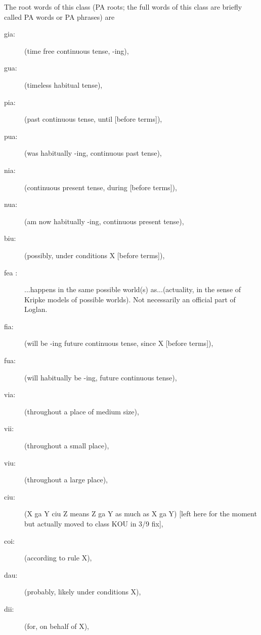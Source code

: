 \documentclass[12pt]{book}
\begin{document}
The root words of this class  (PA roots;  the full words of this class are briefly called PA words or PA phrases) are
\begin{description}

\item[gia:] (time free continuous tense, -ing), 

\item[gua:]  (timeless habitual tense), 

\item[pia:]  (past continuous tense, until [before terms]), 

\item[pua:]  (was habitually -ing, continuous past tense), 

\item[nia:]  (continuous present tense, during [before terms]), 

\item[nua:]  (am now habitually -ing, continuous present tense), 

\item[biu:]  (possibly, under conditions X [before terms]), 

\item[fea :] ...happens in the same possible world(s) as...(actuality, in the sense of Kripke models of possible worlds).  Not necessarily an official part of Loglan.

\item[fia:]  (will be -ing future continuous tense, since X [before terms]), 

\item[fua:]  (will habitually be -ing, future continuous tense), 

\item[via:]  (throughout a place of medium size), 

\item[vii:]  (throughout a small place), 

\item[viu:]  (throughout a large place), 

\item[ciu:]  (X ga Y ciu Z means Z ga Y as much as X ga Y)  [left here for the moment but actually moved to class KOU in 3/9 fix],

\item[coi:]  (according to rule X), 

\item[dau:]  (probably, likely under conditions X), 

\item[dii:]  (for, on behalf of X), 


\end{description}
\end{document}
